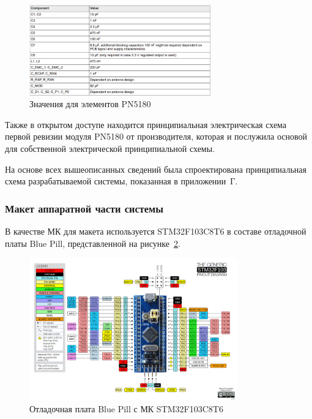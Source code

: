 \begin{figure}[H]
    \centering
    \includegraphics[width=0.7\textwidth]{images/design/pn5180mincompvalues}
    \caption{\centering Значения для элементов PN5180}
    \label{fig:pn5180mincompvalues}
\end{figure}

Также в открытом доступе находится принципиальная электрическая схема первой ревизии модуля PN5180 от производителя, которая и послужила основой для собственной электрической принципиальной схемы\cite{pn5180_schematic}.


На основе всех вышеописанных сведений была спроектирована принципиальная схема разрабатываемой системы, показанная в приложении~Г.





\subsubsection{Макет аппаратной части системы}

В качестве МК для макета используется STM32F103C8T6 в составе отладочной платы Blue Pill, представленной на рисунке~\ref{fig:blue_pill}.

\begin{figure}[H]
    \centering
    \includegraphics[width=0.8\textwidth]{images/design/blue_pill}
    \caption{\centering Отладочная плата Blue Pill с МК STM32F103C8T6}
    \label{fig:blue_pill}
\end{figure}

